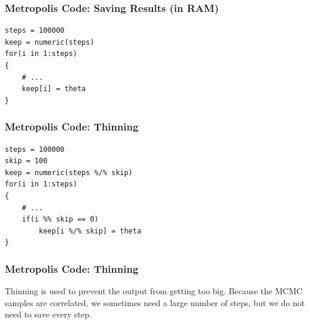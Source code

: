 \documentclass{beamer}
\begin{document}
\begin{frame}[fragile]
\frametitle{Metropolis Code: Saving Results (in RAM)}
\begin{verbatim}
steps = 100000
keep = numeric(steps)
for(i in 1:steps)
{
    # ...
    keep[i] = theta
}
\end{verbatim}
\end{frame}


\begin{frame}[fragile]
\frametitle{Metropolis Code: Thinning}
\begin{verbatim}
steps = 100000
skip = 100
keep = numeric(steps %/% skip)
for(i in 1:steps)
{
    # ...
    if(i %% skip == 0)
        keep[i %/% skip] = theta
}
\end{verbatim}
\end{frame}


\begin{frame}
\frametitle{Metropolis Code: Thinning}
Thinning is used to prevent the output from getting too big.
Because the MCMC samples are correlated, we sometimes need a large number
of steps, but we do not need to save every step.
\end{frame}
\end{document}
